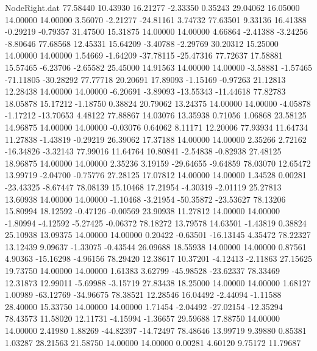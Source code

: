 \begin{filecontents}{NodeRight.dat}
  77.58440   10.43930   16.21277    -2.33350    0.35243   29.04062   16.05000   14.00000   14.00000    3.56070   -2.21277  -24.81161    3.74732
  77.63501    9.33136   16.41388    -0.29219   -0.79357   31.47500   15.31875   14.00000   14.00000    4.66864   -2.41388   -3.24256   -8.80646
  77.68568   12.45331   15.64209    -3.40788   -2.29769   30.20312   15.25000   14.00000   14.00000    1.54669   -1.64209  -37.78115  -25.47316
  77.72637   17.58881   15.57465    -6.23706   -2.65582   25.45000   14.91563   14.00000   14.00000   -3.58881   -1.57465  -71.11805  -30.28292
  77.77718   20.20691   17.89093    -1.15169   -0.97263   21.12813   12.28438   14.00000   14.00000   -6.20691   -3.89093  -13.55343  -11.44618
  77.82783   18.05878   15.17212    -1.18750    0.38824   20.79062   13.24375   14.00000   14.00000   -4.05878   -1.17212  -13.70653    4.48122
  77.88867   14.03076   13.35938     0.71056    1.06868   23.58125   14.96875   14.00000   14.00000   -0.03076    0.64062    8.11171   12.20006
  77.93934   11.64734   11.27838    -1.43819   -0.29219   26.39062   17.37188   14.00000   14.00000    2.35266    2.72162  -16.34826   -3.32143
  77.99016   11.64764   10.80841    -2.54838   -0.82938   27.48125   18.96875   14.00000   14.00000    2.35236    3.19159  -29.64655   -9.64859
  78.03070   12.65472   13.99719    -2.04700   -0.75776   27.28125   17.07812   14.00000   14.00000    1.34528    0.00281  -23.43325   -8.67447
  78.08139   15.10468   17.21954    -4.30319   -2.01119   25.27813   13.60938   14.00000   14.00000   -1.10468   -3.21954  -50.35872  -23.53627
  78.13206   15.80994   18.12592    -0.47126   -0.00569   23.90938   11.27812   14.00000   14.00000   -1.80994   -4.12592   -5.27425   -0.06372
  78.18272   13.79578   14.63501    -1.43819    0.38824   25.10938   13.09375   14.00000   14.00000    0.20422   -0.63501  -16.13145    4.35472
  78.22327   13.12439    9.09637    -1.33075   -0.43544   26.09688   18.55938   14.00000   14.00000    0.87561    4.90363  -15.16298   -4.96156
  78.29420   12.38617   10.37201    -4.12413   -2.11863   27.15625   19.73750   14.00000   14.00000    1.61383    3.62799  -45.98528  -23.62337
  78.33469   12.31873   12.99011    -5.69988   -3.15719   27.83438   18.25000   14.00000   14.00000    1.68127    1.00989  -63.12769  -34.96675
  78.38521   12.28546   16.04492    -2.44094   -1.11588   28.40000   15.33750   14.00000   14.00000    1.71454   -2.04492  -27.02154  -12.35294
  78.43573   11.58020   12.11731    -4.15994   -1.36657   29.59688   17.88750   14.00000   14.00000    2.41980    1.88269  -44.82397  -14.72497
  78.48646   13.99719    9.39880     0.85381    1.03287   28.21563   21.58750   14.00000   14.00000    0.00281    4.60120    9.75172   11.79687

\end{filecontents}
